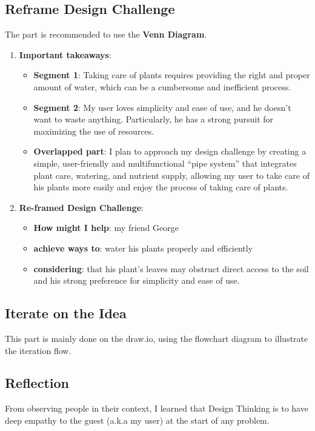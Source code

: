 \documentclass[math,code]{amznotes}
\theoremstyle{remark}
\begin{document}
\subsection{Reframe Design Challenge}
The part is recommended to use the \textbf{Venn Diagram}.
\begin{enumerate}
    \item \textbf{Important takeaways}:
    \begin{itemize}
        \item \textbf{Segment 1}: Taking care of plants requires providing the right and proper amount of water, which can be a cumbersome and inefficient process.
        \item \textbf{Segment 2}: My user loves simplicity and ease of use, and he doesn't want to waste anything. Particularly, he has a strong pursuit for maximizing the use of resources.
        \item \textbf{Overlapped part}: I plan to approach my design challenge by creating a simple, user-friendly and multifunctional ``pipe system'' that integrates plant care, watering, and nutrient supply, allowing my user to take care of his plants more easily and enjoy the process of taking care of plants.
    \end{itemize}
    \item \textbf{Re-framed Design Challenge}:
    \begin{itemize}
        \item \textbf{How might I help}: my friend George
        \item \textbf{achieve ways to}: water his plants properly and efficiently
        \item \textbf{considering}: that his plant’s leaves may obstruct direct access to the soil and his strong preference for simplicity and ease of use.
    \end{itemize}
\end{enumerate}

\subsection{Iterate on the Idea}
This part is mainly done on the draw.io, using the flowchart diagram to illustrate the iteration flow.

\subsection{Reflection}
From observing people in their context, I learned that Design Thinking is to have deep empathy to the guest (a.k.a my user) at the start of any problem.
\end{document}
